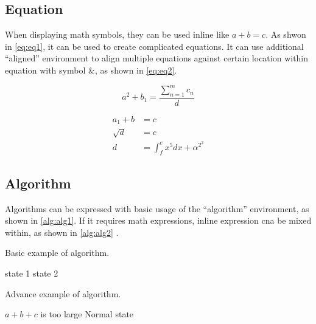 \subsection{Equation}

When displaying math symbols, they can be used inline like $a+b=c$. As shwon in \autoref{eq:eq1}, it can be used to create complicated equations. It can use additional \enquote{aligned} environment to align multiple equations against certain location within equation with symbol $\&$, as shown in \autoref{eq:eq2}.

\begin{equation}
    a^2+b_1=\dfrac{\sum\limits^{m}_{n=1}c_n}{d}
    \label{eq:eq1}
\end{equation}

\begin{equation}
    \begin{aligned}
        a_1+b&=c \\
        \sqrt{d}&=c \\
        d&=\int^e_fx^5dx+\alpha^{2^2}
    \label{eq:eq2}
    \end{aligned}
\end{equation}

\subsection{Algorithm}

Algorithms can be expressed with basic usage of the \enquote{algorithm} environment, as shown in \autoref{alg:alg1}. If it requires math expressions, inline expression cna be mixed within, as shown in \autoref{alg:alg2} \cite{overleaf_alg}.

\begin{algorithm}
    \caption{Basic example of algorithm.}
    \label{alg:alg1}
    \begin{algorithmic}
            \State state 1
        \Else
            \State state 2
        \EndIf
    \end{algorithmic}
\end{algorithm}

\begin{algorithm}
    \caption{Advance example of algorithm.}
    \label{alg:alg2}
    \begin{algorithmic}
            \State $a+b+c$ is too large
        \Else
            \State Normal state
        \EndIf
    \end{algorithmic}
\end{algorithm}

